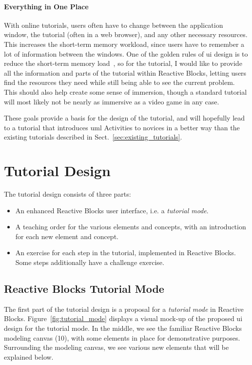 \paragraph{Everything in One Place} With online tutorials, users often have to change between the application window, the tutorial (often in a web browser), and any other necessary resources. This increases the short-term memory workload, since users have to remember a lot of information between the windows. One of the golden rules of \gls{ui} design is to reduce the short-term memory load~\cite{shneiderman:user_interface}, so for the tutorial, I would like to provide all the information and parts of the tutorial within Reactive Blocks, letting users find the resources they need while still being able to see the current problem. This should also help create some sense of immersion, though a standard tutorial will most likely not be nearly as immersive as a video game in any case.

\noindent
These goals provide a basis for the design of the tutorial, and will hopefully lead to a tutorial that introduces \gls{uml} Activities to novices in a better way than the existing tutorials described in Sect.~\ref{sec:existing_tutorials}.

\section{Tutorial Design}
\label{sec:tutorial_design}
The tutorial design consists of three parts:

\begin{itemize}
	\item An enhanced Reactive Blocks user interface, i.e. a \emph{tutorial mode}.
	\item A teaching order for the various elements and concepts, with an introduction for each new element and concept.
	\item An exercise for each step in the tutorial, implemented in Reactive Blocks. Some steps additionally have a challenge exercise.
\end{itemize}

\subsection{Reactive Blocks Tutorial Mode}
\label{sec:reactive_blocks_tutorial_mode}
The first part of the tutorial design is a proposal for a \emph{tutorial mode} in Reactive Blocks. Figure~\ref{fig:tutorial_mode} displays a visual mock-up of the proposed \gls{ui} design for the tutorial mode. In the middle, we see the familiar Reactive Blocks modeling canvas (10), with some elements in place for demonstrative purposes. Surrounding the modeling canvas, we see various new elements that will be explained below.

